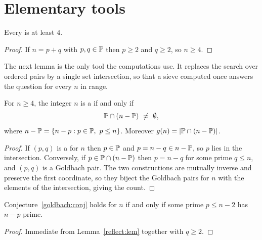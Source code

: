 \section{Elementary tools}\label{sec:tools}

\begin{lemma}\label{lower:lem}
Every  is at least $4$.
\end{lemma}

\begin{proof}
If $n=p+q$ with $p,q\in\mathbb{P}$ then $p\geq2$ and $q\geq2$, so $n\geq4$.
\end{proof}

The next lemma is the only tool the computations use.  It replaces the search
over ordered pairs by a single set intersection, so that a sieve computed once
answers the question for every $n$ in range.

\begin{lemma}\label{reflect:lem}
For $n\geq4$, the integer $n$ is a  if and only if
\[
  \Prset\cap(n-\Prset)\ \neq\ \emptyset ,
\]
where $n-\mathbb{P}=\{n-p:p\in\mathbb{P},\ p\leq n\}$.  Moreover
$g(n)=|\mathbb{P}\cap(n-\mathbb{P})|$.
\end{lemma}

\begin{proof}
If $(p,q)$ is a  for $n$ then $p\in\mathbb{P}$ and
$p=n-q\in n-\mathbb{P}$, so $p$ lies in the intersection.  Conversely, if
$p\in\mathbb{P}\cap(n-\mathbb{P})$ then $p=n-q$ for some prime $q\leq n$, and $(p,q)$
is a Goldbach pair.  The two constructions are mutually inverse and preserve
the first coordinate, so they biject the Goldbach pairs for $n$ with the
elements of the intersection, giving the count.
\end{proof}

\begin{cor}\label{even:cor}
Conjecture~\ref{goldbach:conj} holds for $n$ if and only if some prime
$p\leq n-2$ has $n-p$ prime.
\end{cor}

\begin{proof}
Immediate from Lemma~\ref{reflect:lem} together with $q\geq2$.
\end{proof}
